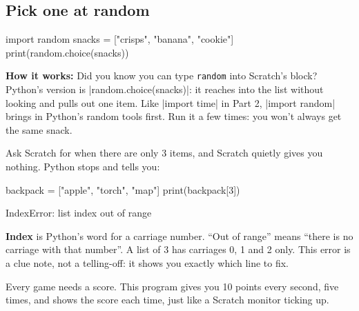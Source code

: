 \subsection*{Pick one at random}

\begin{center}
\begin{scratch}
\end{scratch}
\end{center}
\begin{code}
import random
snacks = ["crisps", "banana", "cookie"]
print(random.choice(snacks))
\end{code}

\textbf{How it works:} Did you know you can type \texttt{random} into Scratch's  block? Python's version is \py|random.choice(snacks)|: it reaches into the list without looking and pulls out one item. Like \py|import time| in Part 2, \py|import random| brings in Python's random tools first. Run it a few times: you won't always get the same snack.

\begin{watchout}
Ask Scratch for  when there are only 3 items, and Scratch quietly gives you nothing. Python stops and tells you:
\begin{codenonum}
backpack = ["apple", "torch", "map"]
print(backpack[3])
\end{codenonum}
\begin{errorbox}
IndexError: list index out of range
\end{errorbox}
\textbf{Index} is Python's word for a carriage number. ``Out of range'' means ``there is no carriage with that number''. A list of 3 has carriages 0, 1 and 2 only. This error is a clue note, not a telling-off: it shows you exactly which line to fix.
\end{watchout}


Every game needs a score. This program gives you 10 points every second, five times, and shows the score each time, just like a Scratch monitor ticking up.

